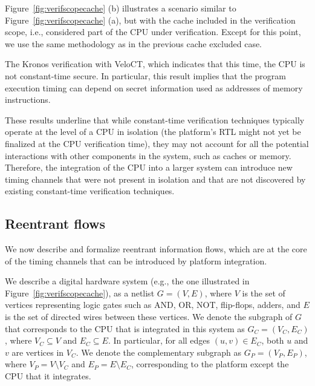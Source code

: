 Figure~\ref{fig:verifscopecache} (b) illustrates a scenario similar to Figure~\ref{fig:verifscopecache} (a), but with the cache included in the verification scope, i.e., considered part of the CPU under verification.
Except for this point, we use the same methodology as in the previous cache excluded case.

The Kronos verification with VeloCT, which indicates that this time, the CPU is not constant-time secure.
In particular, this result implies that the program execution timing can depend on secret information used as addresses of memory instructions.

These results underline that while constant-time verification techniques typically operate at the level of a CPU in isolation (the platform's RTL might not yet be finalized at the CPU verification time), they may not account for all the potential interactions with other components in the system, such as caches or memory.
Therefore, the integration of the CPU into a larger system can introduce new timing channels that were not present in isolation and that are not discovered by existing constant-time verification techniques.

\subsection{Reentrant flows}

We now describe and formalize reentrant information flows, which are at the core of the timing channels that can be introduced by platform integration.

We describe a digital hardware system (e.g., the one illustrated in Figure~\ref{fig:verifscopecache}), as a netlist $G = (V, E)$, where $V$ is the set of vertices representing logic gates such as AND, OR, NOT, flip-flops, adders, and $E$ is the set of directed wires between these vertices.
We denote the subgraph of $G$ that corresponds to the CPU that is integrated in this system as $G_C = (V_C, E_C)$, where $V_C \subseteq V$ and $E_C \subseteq E$.
In particular, for all edges $(u, v) \in E_C$, both $u$ and $v$ are vertices in $V_C$.
We denote the complementary subgraph as $G_{P} = (V_{P}, E_{P})$, where $V_{P} = V \setminus V_C$ and $E_{P} = E \setminus E_C$, corresponding to the platform except the CPU that it integrates.

